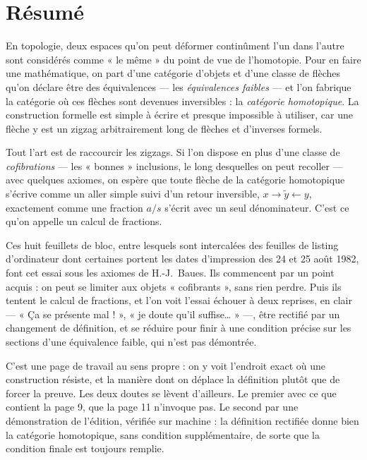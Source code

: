 \documentclass[11pt,a4paper]{article}
\begin{document}
\section*{Résumé}

\begin{resume}
En topologie, deux espaces qu'on peut déformer continûment l'un dans l'autre
sont considérés comme « le même » du point de vue de l'homotopie. Pour en
faire une mathématique, on part d'une catégorie d'objets et d'une classe de
flèches qu'on déclare être des équivalences --- les \emph{équivalences
faibles} --- et l'on fabrique la catégorie où ces flèches sont devenues
inversibles : la \emph{catégorie homotopique}. La construction formelle est
simple à écrire et presque impossible à utiliser, car une flèche y est un
zigzag arbitrairement long de flèches et d'inverses formels.

Tout l'art est de raccourcir les zigzags. Si l'on dispose en plus d'une
classe de \emph{cofibrations} --- les « bonnes » inclusions, le long
desquelles on peut recoller --- avec quelques axiomes, on espère que toute
flèche de la catégorie homotopique s'écrive comme un aller simple suivi d'un
retour inversible, $x \to \widetilde{y} \leftarrow y$, exactement comme une
fraction $a/s$ s'écrit avec un seul dénominateur. C'est ce qu'on appelle un
calcul de fractions.

Ces huit feuillets de bloc, entre lesquels sont intercalées des feuilles de
listing d'ordinateur dont certaines portent les dates d'impression des 24
et 25 août 1982, font cet essai sous
les axiomes de H.-J.~Baues. Ils commencent par un point acquis : on peut se
limiter aux objets « cofibrants », sans rien perdre. Puis ils tentent le
calcul de fractions, et l'on voit l'essai échouer à deux reprises, en clair
--- « Ça se présente mal ! », « je doute qu'il suffise… » ---, être rectifié
par un changement de définition, et se réduire pour finir à une condition
précise sur les sections d'une équivalence faible, qui n'est pas démontrée.

C'est une page de travail au sens propre : on y voit l'endroit exact où une
construction résiste, et la manière dont on déplace la définition plutôt que
de forcer la preuve. Les deux doutes se lèvent d'ailleurs. Le premier avec ce
que contient la page 9, que la page 11 n'invoque pas. Le second par une
démonstration de l'édition, vérifiée sur machine : la définition rectifiée
donne bien la catégorie homotopique, sans condition supplémentaire, de sorte
que la condition finale est toujours remplie.

\end{resume}
\end{document}

